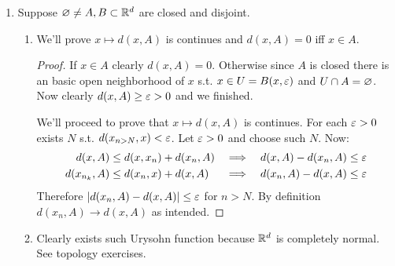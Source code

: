 \documentclass[a4paper]{article}
\begin{document}
\begin{enumerate}
		\item Suppose $\varnothing \neq A, B \subset \mathbb{R}^{d}$ are closed and disjoint.
		\begin{enumerate}
			\item We'll prove $x \mapsto d(x, A)$ is continues and $d(x, A) = 0$ iff $x \in A$. \begin{proof}
				If $x \in A$ clearly $d(x, A) = 0$. Otherwise since $A$ is closed there is an basic open neighborhood of $x$ s.t. $x \in U = B(x, \eg)$ and $U \cap A = \varnothing$. Now clearly $d(x, A) \ge \eg > 0$ and we finished. 
				
				We'll proceed to prove that $x \mapsto d(x, A)$ is continues. For each $\eg > 0$ exists  $N$ s.t. $d(x_{n> N}, x) < \eg$. Let $\eg > 0$ and choose such $N$. Now: 
				\begin{align*}
					d(x, A) &\le d(x, x_{n}) + d(x_{n}, A) & \implies && d(x, A) - d(x_{n}, A) &\le \eg \\ 
					d(x_{n_k}, A) &\le d(x_{n}, x) + d(x, A) & \implies && d(x_{n}, A) - d(x, A) &\le \eg
				\end{align*}
				Therefore $\sof{d(x_{n}, A) - d(x, A)} \le \eg$ for $n > N$. By definition $d(x_{n}, A) \to d(x, A)$ as intended. 
			\end{proof}
			\item Clearly exists such Urysohn function because $\mathbb{R}^{d}$ is completely normal. See topology exercises. 
		\end{enumerate}
	\end{enumerate}
	
\end{document}
